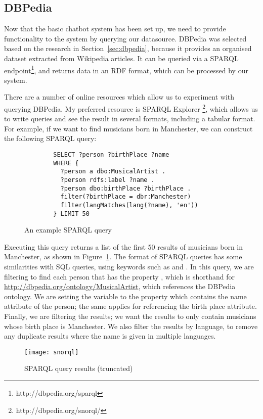\newpage
\subsection{DBPedia}
Now that the basic chatbot system has been set up, we need to provide functionality to the system by querying our datasource. DBPedia was selected based on the research in Section~\ref{sec:dbpedia}, because it provides an organised dataset extracted from Wikipedia articles. It can be queried via a SPARQL endpoint\footnote{http://dbpedia.org/sparql}, and returns data in an RDF format, which can be processed by our system.

There are a number of online resources which allow us to experiment with querying DBPedia. My preferred resource is SPARQL Explorer \footnote{http://dbpedia.org/snorql/}, which allows us to write queries and see the result in several formats, including a tabular format. For example, if we want to find musicians born in Manchester, we can construct the following SPARQL query:
\begin{figure}[h]
	\begin{lstlisting}
		SELECT ?person ?birthPlace ?name
		WHERE {
		  ?person a dbo:MusicalArtist .
		  ?person rdfs:label ?name .
		  ?person dbo:birthPlace ?birthPlace .
		  filter(?birthPlace = dbr:Manchester)
		  filter(langMatches(lang(?name), 'en'))
		} LIMIT 50 
	\end{lstlisting}
	\caption{An example SPARQL query}
	\label{fig:sparql1}
\end{figure}

Executing this query returns a list of the first 50 results of musicians born in Manchester, as shown in Figure~\ref{fig:sparql1}. The format of SPARQL queries has some similarities with SQL queries, using keywords such as  and . In this query, we are filtering to find each person that has the property , which is shorthand for \url{http://dbpedia.org/ontology/MusicalArtist}, which references the DBPedia ontology. We are setting the variable  to the property  which contains the name attribute of the person; the same applies for  referencing the birth place attribute. Finally, we are filtering the results; we want the results to only contain musicians whose birth place is Manchester. We also filter the  results by language, to remove any duplicate results where the name is given in multiple languages.

\begin{figure}[h]
	\centering
	\texttt{[image: snorql]}
	\caption{SPARQL query results (truncated)}
	\label{fig:sparql2}
\end{figure}

